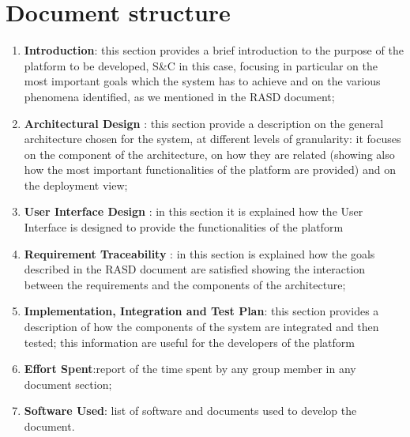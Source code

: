 	\section{Document structure}
		\begin{enumerate}
			\item \textbf{Introduction}: this section provides a brief introduction to the purpose of the platform to be developed, S\&C in this case, focusing in particular on the most important goals which the system has to achieve and on the various phenomena identified, as we mentioned in the RASD document;
			\item \textbf{Architectural Design} : this section provide a description on the general architecture chosen for the system, at different levels of granularity: it focuses on the component of the architecture, on how they are related (showing also how the most important functionalities of the platform are provided) and on the deployment view;
			\item \textbf{User Interface Design} : in this section it is explained how the User Interface is designed to provide the functionalities of the platform
			\item \textbf{Requirement Traceability} : in this section is explained how the goals described in the RASD document are satisfied showing the interaction between the requirements and the components of the architecture;
			\item \textbf{Implementation, Integration and Test Plan}: this section provides a description of how the components of the system are integrated and then tested; this information are useful for the developers of the platform
			\item \textbf{Effort Spent}:report of the time spent by any group member in any document section;
			\item \textbf{Software Used}: list of software and documents used to develop the document.
		\end{enumerate}